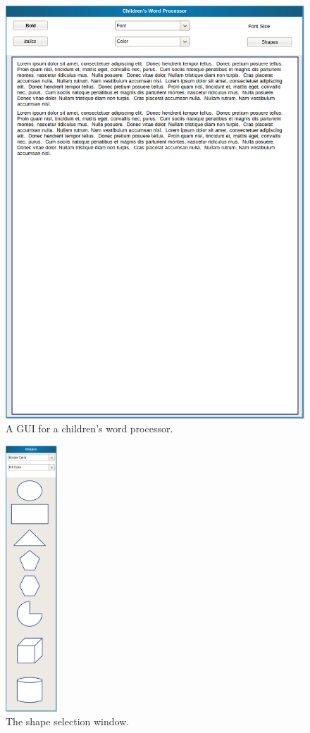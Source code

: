 \documentclass{abrice}
\begin{document}
\begin{figure}
  \centering
  \includegraphics{foobar.png}
  \caption{A GUI for a children's word processor.}
\end{figure}

\begin{figure}
  \centering
  \includegraphics[height=10cm]{shapes.png}
  \caption{The shape selection window.}
\end{figure}
\end{document}
